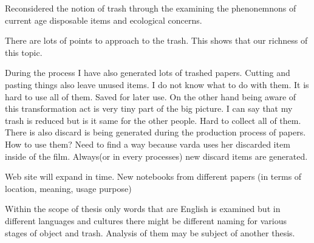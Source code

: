 Reconsidered the notion of trash through the examining the phenonemnons of current age disposable items and ecological concerns. 

There are lots of points to approach to the trash. This shows that our richness of this topic. 











%
%
During the process I have also generated lots of trashed papers. Cutting and pasting things also leave unused items. I do not know what to do with them. It is hard to use all of them. Saved for later use. On the other hand being aware of this transformation act is very tiny part of the big picture. I can say that my trash is reduced but is it same for the other people. Hard to collect all of them. There is also discard is being generated during the production process of papers. How to use them? Need to find a way because varda uses her discarded item inside of the film. Always(or in every processes) new discard items are generated.






%
%
Web site will expand in time. New notebooks from different papers (in terms of location, meaning, usage purpose)

Within the scope of thesis only words that are English is examined but in different languages and cultures there might be different naming for various stages of object and trash. Analysis of them may be subject of another thesis.







